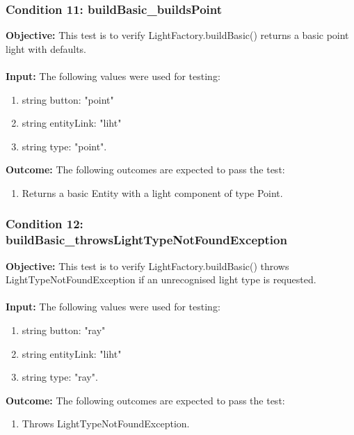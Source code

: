 \documentclass[a4paper,12pt]{article}
\begin{document}
		\subsubsection{Condition 11: buildBasic\_buildsPoint}
			\textbf{Objective:} This test is to verify  LightFactory.buildBasic() returns a basic point light with defaults.\\\\
			\textbf{Input:} The following values were used for testing:
				\begin{enumerate}
					\item string button: "point"
					\item string entityLink: "liht"
					\item string type: "point".
				\end{enumerate}
			\textbf{Outcome:} The following outcomes are expected to pass the test:
				\begin{enumerate}
					\item Returns a basic Entity with a light component of type Point.
				\end{enumerate}
		\subsubsection{Condition 12: buildBasic\_throwsLightTypeNotFoundException}
			\textbf{Objective:} This test is to verify  LightFactory.buildBasic() throws LightTypeNotFoundException if an unrecognised light type is requested.\\\\
			\textbf{Input:} The following values were used for testing:
				\begin{enumerate}
					\item string button: "ray"
					\item string entityLink: "liht"
					\item string type: "ray".
				\end{enumerate}
			\textbf{Outcome:} The following outcomes are expected to pass the test:
				\begin{enumerate}
					\item Throws LightTypeNotFoundException.
				\end{enumerate}
\end{document}
